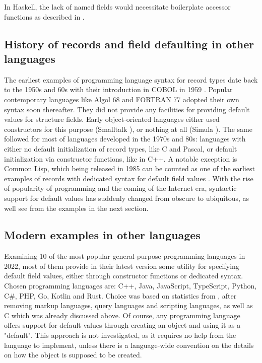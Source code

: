 \documentclass[en]{pracamgr}
\begin{document}
In Haskell, the lack of named fields would necessitate boilerplate accessor functions as described in \cite{WikibooksHaskellDatatypes}.

\subsection{History of records and field defaulting in other languages}
The earliest examples of programming language syntax for record types date back to the 1950s and 60s with their introduction in COBOL in 1959 \cite{sebesta1996concepts}.
Popular contemporary languages like Algol 68 \cite{van2012revised} and FORTRAN 77 \cite{fortran77} adopted their own syntax soon thereafter.
They did not provide any facilities for providing default values for structure fields.
Early object-oriented languages either used constructors for this purpose (Smalltalk \cite{smalltalk80}), or nothing at all (Simula \cite{Simula67}).
The same followed for most of languages developed in the 1970s and 80s: languages with either no default initialization of record types, like C and Pascal,
or default initialization via constructor functions, like in C++.
A notable exception is Common Lisp, which being released in 1985 can be counted 
as one of the earliest examples of records with dedicated syntax for default field values \cite{CommonLisp}.
With the rise of popularity of programming and the coming of the Internet era, 
syntactic support for default values has suddenly changed from obscure to ubiquitous, as well see from the examples in the next section.
\subsection{Modern examples in other languages}
Examining 10 of the most popular general-purpose programming languages in 2022,
most of them provide in their latest version some utility for specifying default field values,
either through constructor functions or dedicated syntax.
Chosen programming languages are: C++, Java, JavaScript, TypeScript, Python, C\#, PHP, Go, Kotlin and Rust.
Choice was based on statistics from \cite{StatistaProgLangs}, after removing markup languages, 
query languages and scripting languages, as well as C which was already discussed above.
Of course, any programming language offers support for default values through creating an object and using it as a "default".
This approach is not investigated, as it requires no help from the language to implement, unless there is a language-wide
convention on the details on how the object is supposed to be created. 
\end{document}
